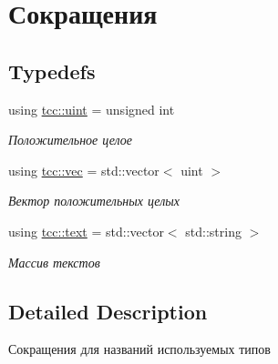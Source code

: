 \hypertarget{group__aliases}{}\section{Сокращения}
\label{group__aliases}
\subsection*{Typedefs}
\begin{DoxyCompactItemize}
\item 
using \hyperlink{group__aliases_gae00908f082db728f73e52c3b4932261a}{tcc\+::uint} = unsigned int\hypertarget{group__aliases_gae00908f082db728f73e52c3b4932261a}{}\label{group__aliases_gae00908f082db728f73e52c3b4932261a}

\begin{DoxyCompactList}\small\item\em Положительное целое \end{DoxyCompactList}\item 
using \hyperlink{group__aliases_ga33d75c4fd4f8d49a28f246c2e0a0f3a5}{tcc\+::vec} = std\+::vector$<$ uint $>$\hypertarget{group__aliases_ga33d75c4fd4f8d49a28f246c2e0a0f3a5}{}\label{group__aliases_ga33d75c4fd4f8d49a28f246c2e0a0f3a5}

\begin{DoxyCompactList}\small\item\em Вектор положительных целых \end{DoxyCompactList}\item 
using \hyperlink{group__aliases_ga085c5ca5bf5645ff17c0ede30f56b08f}{tcc\+::text} = std\+::vector$<$ std\+::string $>$\hypertarget{group__aliases_ga085c5ca5bf5645ff17c0ede30f56b08f}{}\label{group__aliases_ga085c5ca5bf5645ff17c0ede30f56b08f}

\begin{DoxyCompactList}\small\item\em Массив текстов \end{DoxyCompactList}\end{DoxyCompactItemize}


\subsection{Detailed Description}
Сокращения для названий используемых типов 